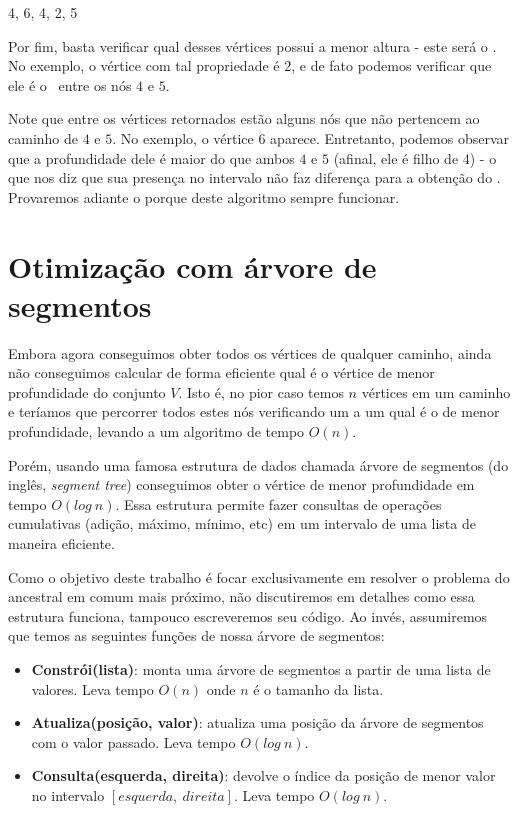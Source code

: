 \vspace{0.3cm}

\begin{center}
    4, 6, 4, 2, 5    
\end{center}

Por fim, basta verificar qual desses vértices possui a menor altura - este será o \LCA. No exemplo, o vértice com tal propriedade é $2$, e de fato podemos verificar que ele é o \LCA\ entre os nós $4$ e $5$.

Note que entre os vértices retornados estão alguns nós que não pertencem ao caminho de $4$ e $5$. No exemplo, o vértice $6$ aparece. Entretanto, podemos observar que a profundidade dele é maior do que ambos $4$ e $5$ (afinal, ele é filho de $4$) - o que nos diz que sua presença no intervalo não faz diferença para a obtenção do \LCA. Provaremos adiante o porque deste algoritmo sempre funcionar.

\section{Otimização com árvore de segmentos}

Embora agora conseguimos obter todos os vértices de qualquer caminho, ainda não conseguimos calcular de forma eficiente qual é o vértice de menor profundidade do conjunto $V$. Isto é, no pior caso temos $n$ vértices em um caminho e teríamos que percorrer todos estes nós verificando um a um qual é o de menor profundidade, levando a um algoritmo de tempo $O(n)$.

Porém, usando uma famosa estrutura de dados chamada árvore de segmentos (do inglês, \textit{segment tree}) conseguimos obter o vértice de menor profundidade em tempo $O(log\ n)$. Essa estrutura permite fazer consultas de operações cumulativas (adição, máximo, mínimo, etc) em um intervalo de uma lista de maneira eficiente.

Como o objetivo deste trabalho é focar exclusivamente em resolver o problema do ancestral em comum mais próximo, não discutiremos em detalhes como essa estrutura funciona, tampouco escreveremos seu código. Ao invés, assumiremos que temos as seguintes funções de nossa árvore de segmentos:

\begin{itemize}
    \item \textbf{Constrói(lista)}: monta uma árvore de segmentos a partir de uma lista de valores. Leva tempo $O(n)$ onde $n$ é o tamanho da lista.
    \item \textbf{Atualiza(posição, valor)}: atualiza uma posição da árvore de segmentos com o valor passado. Leva tempo $O(log\ n)$.
    \item \textbf{Consulta(esquerda, direita)}: devolve o índice da posição de menor valor no intervalo $[esquerda,\ direita]$. Leva tempo $O(log\ n)$.
\end{itemize}

